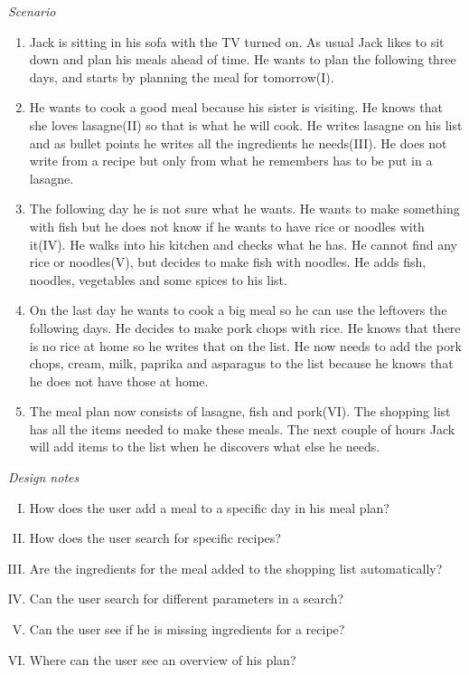 \emph{Scenario}
\begin{enumerate}
\item Jack is sitting in his sofa with the TV turned on. As usual Jack likes to sit down and plan his meals ahead of time. He wants to plan the following three days, and starts by planning the meal for tomorrow(I).
\item He wants to cook a good meal because his sister is visiting. He knows that she loves lasagne(II) so that is what he will cook. He writes lasagne on his list and as bullet points he writes all the ingredients he needs(III). He does not write from a recipe but only from what he remembers has to be put in a lasagne.
\item The following day he is not sure what he wants. He wants to make something with fish but he does not know if he wants to have rice or noodles with it(IV). He walks into his kitchen and checks what he has. He cannot find any rice or noodles(V), but decides to make fish with noodles. He adds fish, noodles, vegetables and some spices to his list.
\item On the last day he wants to cook a big meal so he can use the leftovers the following days. He decides to make pork chops with rice. He knows that there is no rice at home so he writes that on the list. He now needs to add the pork chops, cream, milk, paprika and asparagus to the list because he knows that he does not have those at home. 
\item The meal plan now consists of lasagne, fish and pork(VI). The shopping list has all the items needed to make these meals. The next couple of hours Jack will add items to the list when he discovers what else he needs.   
\end{enumerate}

\emph{Design notes}
\begin{enumerate} [(I)]
\item How does the user add a meal to a specific day in his meal plan?
\item How does the user search for specific recipes?
\item Are the ingredients for the meal added to the shopping list automatically?
\item Can the user search for different parameters in a search?
\item Can the user see if he is missing ingredients for a recipe?
\item Where can the user see an overview of his plan?
\end{enumerate}


